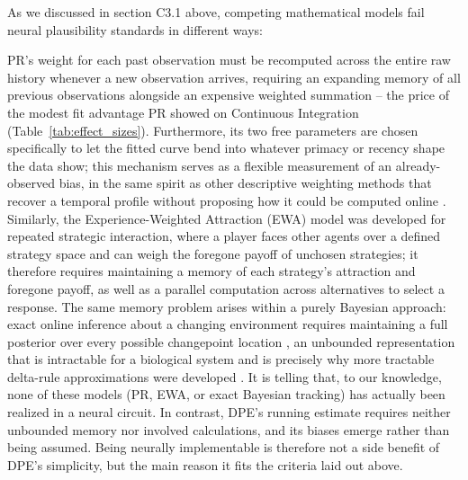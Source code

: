 As we discussed in section C3.1 above, competing mathematical models fail neural plausibility standards in different ways:
\begin{ms}
PR's weight for each past observation must be recomputed across the entire raw history whenever a new observation arrives, requiring an expanding memory of all previous observations alongside an expensive weighted summation -- the price of the modest fit advantage PR showed on Continuous Integration (Table~\ref{tab:effect_sizes}). Furthermore, its two free parameters are chosen specifically to let the fitted curve bend into whatever primacy or recency shape the data show; this mechanism serves as a flexible measurement of an already-observed bias, in the same spirit as other descriptive weighting methods that recover a temporal profile without proposing how it could be computed online \citep{anderson1965primacy, levi2018strategic, okazawa2018psychophysical}. Similarly, the Experience-Weighted Attraction (EWA) model \citep{camerer1999experience, ho2007selftuning} was developed for repeated strategic interaction, where a player faces other agents over a defined strategy space and can weigh the foregone payoff of unchosen strategies; it therefore requires maintaining a memory of each strategy's attraction and foregone payoff, as well as a parallel computation across alternatives to select a response. The same memory problem arises within a purely Bayesian approach: exact online inference about a changing environment requires maintaining a full posterior over every possible changepoint location \citep{adams2007bayesian}, an unbounded representation that is intractable for a biological system and is precisely why more tractable delta-rule approximations were developed \citep{wilson2013mixture}. It is telling that, to our knowledge, none of these models (PR, EWA, or exact Bayesian tracking) has actually been realized in a neural circuit. In contrast, DPE's running estimate requires neither unbounded memory nor involved calculations, and its biases emerge rather than being assumed. Being neurally implementable is therefore not a side benefit of DPE's simplicity, but the main reason it fits the criteria laid out above.
\end{ms}

